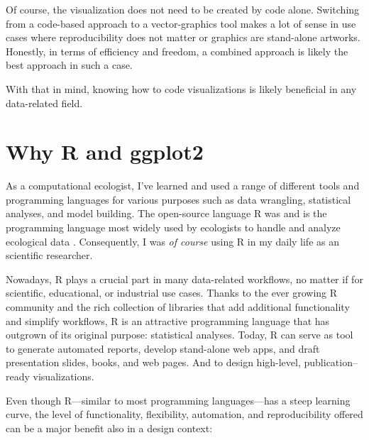 \documentclass[
]{krantz}
\begin{document}
Of course, the visualization does not need to be created by code alone. Switching from a code-based approach to a vector-graphics tool makes a lot of sense in use cases where reproducibility does not matter or graphics are stand-alone artworks. Honestly, in terms of efficiency and freedom, a combined approach is likely the best approach in such a case.

With that in mind, knowing how to code visualizations is likely beneficial in any data-related field.

\hypertarget{why}{%
\section{\texorpdfstring{Why R and \textbf{ggplot2}}{Why R and ggplot2}}\label{why}}

As a computational ecologist, I've learned and used a range of different tools and programming languages for various purposes such as data wrangling, statistical analyses, and model building. The open-source language R was and is the programming language most widely used by ecologists to handle and analyze ecological data \citep{sciaini2018}. Consequently, I was \emph{of course} using R in my daily life as an scientific researcher.

Nowadays, R plays a crucial part in many data-related workflows, no matter if for scientific, educational, or industrial use cases. Thanks to the ever growing R community and the rich collection of libraries that add additional functionality and simplify workflows, R is an attractive programming language that has outgrown of its original purpose: statistical analyses. Today, R can serve as tool to generate automated reports, develop stand-alone web apps, and draft presentation slides, books, and web pages. And to design high-level, publication--ready visualizations.

Even though R---similar to most programming languages---has a steep learning curve, the level of functionality, flexibility, automation, and reproducibility offered can be a major benefit also in a design context:
\end{document}
